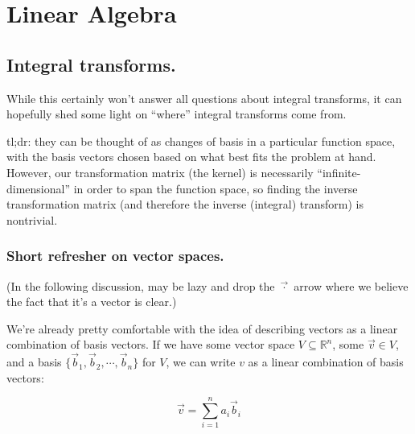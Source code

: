 \documentclass[../main/main.tex]{subfiles}
\begin{document}
\chapter{Linear Algebra}\label{linear-algebra}


\section{Integral transforms.}

While this certainly won't answer all questions about integral transforms, it can hopefully
shed some light on ``where'' integral transforms come from.\par
tl;dr: they can be thought of as changes of basis in a particular function space,
with the basis vectors chosen based on what best fits the problem at hand.
However, our transformation matrix (the kernel) is necessarily ``infinite-dimensional''
in order to span the function space, so finding the inverse transformation matrix
(and therefore the inverse (integral) transform) is nontrivial.

\subsection{Short refresher on vector spaces.}

(In the following discussion,
may be lazy and drop the \(\vec{\cdot}\) arrow where we believe the fact
that it's a vector is clear.)

We're already pretty comfortable with the idea of describing vectors as a linear combination
of basis vectors. If we have some vector space \(V \subseteq \mathbb{R}^n\),
some \(\vec{v} \in V\),
and
a basis \(\{\vec{b}_1, \vec{b}_2, \cdots, \vec{b}_n\}\) for \(V\), we can write
\(v\) as a linear combination of basis vectors:

\[\vec{v} = \sum_{i=1}^{n} a_i\vec{b}_i \]
\end{document}
